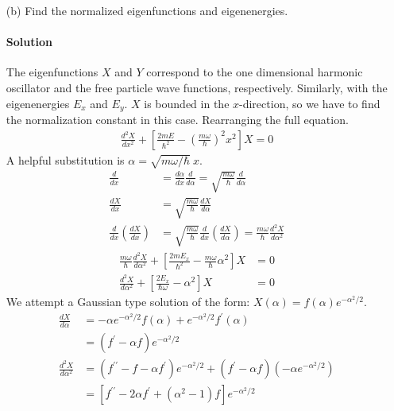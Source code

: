 \documentclass{article}
\numberwithin{equation}{section}
\begin{document}
\begin{enumerate}
\clearpage
				
		\item[(b)] Find the normalized eigenfunctions and eigenenergies.
		\paragraph{Solution} The eigenfunctions $X$ and $Y$ correspond to the one dimensional harmonic oscillator and the free particle wave functions, respectively. Similarly, with the eigenenergies $E_x$ and $E_y$. $X$ is bounded in the $x$-direction, so we have to find the normalization constant in this case. Rearranging the full equation.
        \begin{align}
            \frac{d^2 X}{dx^2} + \left[ \frac{2mE}{\hbar^2} - \left( \frac{m\omega}{\hbar} \right)^2 x^2 \right]X = 0
        \end{align}
        A helpful substitution is $\alpha = \sqrt{m\omega/\hbar} \ x$.
        \begin{align}
            \frac{d}{dx} &= \frac{d\alpha}{dx} \frac{d}{d\alpha} = \sqrt{\frac{m\omega}{\hbar}} \frac{d}{d\alpha} \\
             \frac{dX}{dx} &= \sqrt{\frac{m\omega}{\hbar}} \frac{dX}{d\alpha} \\
             \frac{d}{dx} \left( \frac{dX}{dx} \right) &= \sqrt{\frac{m\omega}{\hbar}} \frac{d}{dx} \left( \frac{dX}{d\alpha} \right) = \frac{m\omega}{\hbar} \frac{d^2X}{d\alpha^2}
        \end{align}
        \begin{align}
            \frac{m\omega}{\hbar} \frac{d^2X}{d\alpha^2} + \left[ \frac{2mE_x}{\hbar^2} - \frac{m\omega}{\hbar} \alpha^2 \right]X &= 0 \\
            \frac{d^2X}{d\alpha^2} + \left[ \frac{2E_x}{\hbar\omega} - \alpha^2 \right]X &= 0
        \end{align}
        We attempt a Gaussian type solution of the form: $X(\alpha) = f(\alpha) e^{-\alpha^2/2}$.
        \begin{align}
            \frac{dX}{d\alpha} &= -\alpha e^{-\alpha^2/2} f(\alpha) + e^{-\alpha^2/2} f^\prime(\alpha) \\
                               &= (f^\prime - \alpha f) e^{-\alpha^2/2} \\
            \frac{d^2X}{d\alpha^2} &= (f^{\prime\prime} - f - \alpha f^\prime) e^{-\alpha^2/2} + (f^\prime - \alpha f) (-\alpha e^{-\alpha^2/2}) \\
            &= \left[ f^{\prime\prime} -2\alpha f^\prime + (\alpha^2 - 1)f \right] e^{-\alpha^2/2}

\end{align}
\end{enumerate}
\end{document}
